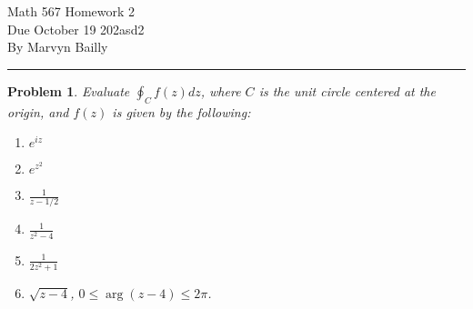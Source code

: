 \documentclass[12pt]{report}
\newtheorem{problem}{Problem}
\begin{document}
\large

\begin{center}
 Math 567 Homework 2\\
 Due October 19 202asd2\\
 By Marvyn Bailly\\
\end{center}

\normalsize

\hrule



\begin{problem}
    Evaluate $\oint_C f(z)dz$, where $C$ is the unit circle centered at the origin, and $f(z)$ is given by the following:
    \begin{enumerate}
        \item [a] $e^{iz}$
        \item [b] $e^{z^2}$
        \item [c] $\frac{1}{z - 1/2}$
        \item [d] $\frac{1}{z^2 - 4}$
        \item [e] $\frac{1}{2z^2 +1}$
        \item [f] $\sqrt{z-4}$, $0 \leq \arg(z-4) \le 2\pi$.
    \end{enumerate}
\end{problem}
\end{document}
